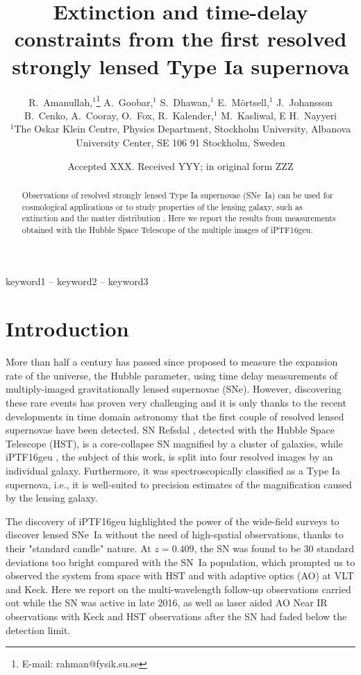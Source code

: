 \documentclass[a4paper,fleqn,usenatbib]{mnras}
\title[Extinction and time-delay constraints from \geu]{Extinction and time-delay constraints from the first resolved strongly lensed Type Ia supernova \geu}
\author[Amanullah et al.]{%
R.~Amanullah,$^{1}$\thanks{E-mail: rahman@fysik.su.se}
A.~Goobar,$^{1}$
S.~Dhawan,$^{1}$ 
E.~M\"ortsell,$^{1}$
J.~Johansson
\newauthor
B.~Cenko,
A.~Cooray,
O.~Fox,
R.~Kalender,$^{1}$
\newauthor
M.~Kasliwal,
E
H.~Nayyeri
\\
$^{1}$The Oskar Klein Centre, Physics Department,
    Stockholm University,
    Albanova University Center, SE 106 91 Stockholm, Sweden\\
}
\date{Accepted XXX. Received YYY; in original form ZZZ}
\newcommand{\geu}{iPTF16geu\xspace}
\newcommand{\sn}{SN\xspace}
\newcommand{\snia}{SN~Ia\xspace}
\newcommand{\sneia}{SNe~Ia\xspace}
\newcommand{\sne}{SNe\xspace}
\begin{document}
\label{firstpage}
\pagerange{\pageref{firstpage}--\pageref{lastpage}}
\maketitle

\begin{abstract}
Observations of resolved strongly lensed Type Ia supernovae (\sneia) can be used for cosmological applications or to study
properties of the lensing galaxy, such as extinction and the matter distribution .  Here we report the results from 
measurements obtained with the Hubble Space Telescope of the multiple images of \geu.
\end{abstract}
\begin{keywords}
keyword1 -- keyword2 -- keyword3
\end{keywords}



\section{Introduction}
More than half a century has passed since
\citet{1964MNRAS.128..307R} proposed  to measure the expansion rate of the universe, the Hubble parameter, using time delay measurements of multiply-imaged gravitationally lensed supernovae (\sne). However, discovering these rare events has proven very challenging and it is only thanks to 
the recent developments in time domain astronomy that the first couple of resolved lensed supernovae have been detected. SN Refsdal \citep{2015Sci...347.1123K}, detected with the Hubble Space Telescope (HST), is a core-collapse \sn magnified by a cluster of galaxies, while 
iPTF16geu \citep{2017Sci...356..291G}, the subject of this work, is split into four resolved images by an individual galaxy. Furthermore, it was spectroscopically classified as a Type Ia supernova,  i.e., it is well-suited to precision estimates of the magnification caused by the lensing galaxy. 

The discovery of iPTF16geu highlighted the power of the wide-field surveys to discover lensed \sneia without the need of high-spatial observations, thanks to their "standard candle" nature. At $z=0.409$, the \sn was found to be 30 standard deviations too bright compared with the \snia population, which prompted us to observed the system from space with HST and with adaptive optics (AO) at VLT and Keck.  Here we report on the multi-wavelength follow-up observations carried out while the \sn was active in late 2016, as well as laser aided AO Near IR observations with Keck and HST observations after the SN had 
faded below the detection limit.
\end{document}
